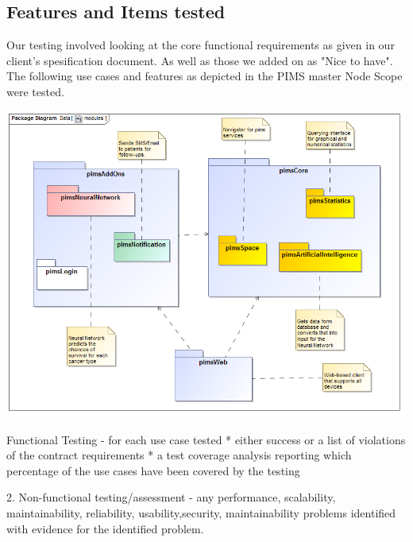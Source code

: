 \subsection{Features and Items tested}

Our testing involved looking at the core functional requirements as given in our client's spesification document. As well as those we added on as "Nice to have". The following use cases and features as depicted in the PIMS master Node Scope were tested.
\newline

\includegraphics[width=\linewidth]{./Graphics/modules.png}
\newline

		Functional Testing
		- for each use case tested
		* either success or a list of violations of the contract requirements
		* a test coverage analysis reporting which percentage of the use cases have been covered by the testing
		
		2. Non-functional testing/assessment
		- any performance, scalability, maintainability, reliability, usability,security, maintainability problems identified with evidence for the identified problem.
	
\newpage			